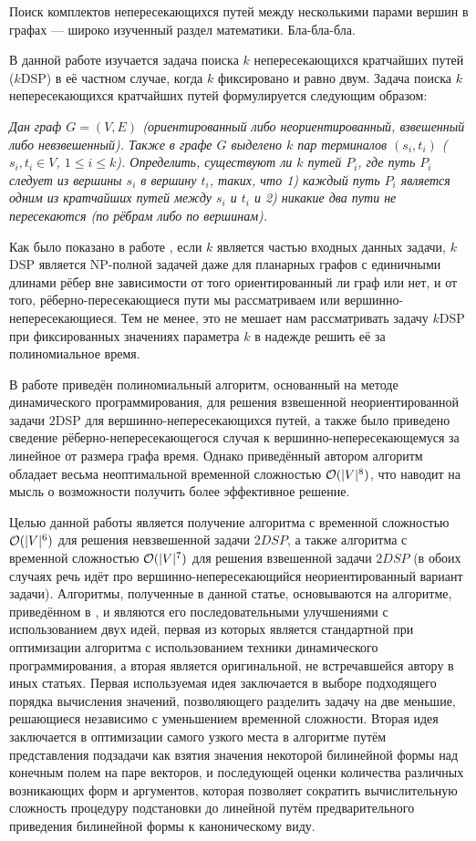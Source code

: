 \Introduction

Поиск комплектов непересекающихся путей между несколькими парами вершин в графах --- широко изученный раздел математики. Бла-бла-бла.

В данной работе изучается задача поиска $k$ непересекающихся кратчайших путей ($k$DSP) в её частном случае, когда $k$ фиксировано и равно двум. Задача поиска $k$ непересекающихся кратчайших путей формулируется следующим образом:

\emph{Дан граф $G = (V, E)$ (ориентированный либо неориентированный, взвешенный либо невзвешенный). Также в графе $G$ выделено $k$ пар терминалов $(s_i, t_i)$ ($s_i, t_i \in V$, $1 \leq i \leq k$). Определить, существуют ли $k$ путей $P_i$, где путь $P_i$ следует из вершины $s_i$ в вершину $t_i$, таких, что 1) каждый путь $P_i$ является одним из кратчайших путей между $s_i$ и $t_i$ и 2) никакие два пути не пересекаются (по рёбрам либо по вершинам).}

Как было показано в работе \cite{ET}, если $k$ является частью входных данных задачи, $k$DSP является NP-полной задачей даже для планарных графов с единичными длинами рёбер вне зависимости от того ориентированный ли граф или нет, и от того, рёберно-пересекающиеся пути мы рассматриваем или вершинно-непересекающиеся. Тем не менее, это не мешает нам рассматривать задачу $k$DSP при фиксированных значениях параметра $k$ в надежде решить её за полиномиальное время. 

В работе \cite{ET} приведён полиномиальный алгоритм, основанный на методе динамического программирования, для решения взвешенной неориентированной задачи $2$DSP для вершинно-непересекающихся путей, а также было приведено сведение рёберно-непересекающегося случая к вершинно-непересекающемуся за линейное от размера графа время. Однако приведённый автором алгоритм обладает весьма неоптимальной временной сложностью $\mathcal{O}(|V|^8)$, что наводит на мысль о возможности получить более эффективное решение.

Целью данной работы является получение алгоритма с временной сложностью $\mathcal{O}(|V|^6)$ для решения невзвешенной задачи $2DSP$, а также алгоритма с временной сложностью $\mathcal{O}(|V|^7)$ для решения взвешенной задачи $2DSP$ (в обоих случаях речь идёт про вершинно-непересекающийся неориентированный вариант задачи). Алгоритмы, полученные в данной статье, основываются на алгоритме, приведённом в \cite{ET}, и являются его последовательными улучшениями с использованием двух идей, первая из которых является стандартной при оптимизации алгоритма с использованием техники динамического программирования, а вторая является оригинальной, не встречавшейся автору в иных статьях. Первая используемая идея заключается в выборе подходящего порядка вычисления значений, позволяющего разделить задачу на две меньшие, решающиеся независимо с уменьшением временной сложности. Вторая идея заключается в оптимизации самого узкого места в алгоритме путём представления подзадачи как взятия значения некоторой билинейной формы над конечным полем на паре векторов, и последующей оценки количества различных возникающих форм и аргументов, которая позволяет сократить вычислительную сложность процедуру подстановки до линейной путём предварительного приведения билинейной формы к каноническому виду.
